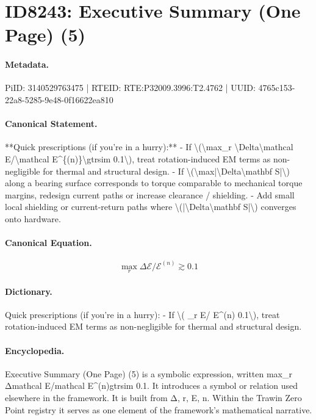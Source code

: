 \section*{ID8243: Executive Summary (One Page) (5)}
\paragraph{Metadata.}
PiID: 3140529763475 | RTEID: RTE:P32009.3996:T2.4762 | UUID: 4765c153-22a8-5285-9e48-0f16622ea810

\paragraph{Canonical Statement.}
**Quick prescriptions (if you’re in a hurry):** - If \textbackslash{}(\textbackslash{}max\_r \textbackslash{}Delta\textbackslash{}mathcal E/\textbackslash{}mathcal E\textasciicircum{}\{(n)\}\textbackslash{}gtrsim 0.1\textbackslash{}), treat rotation-induced EM terms as non-negligible for thermal and structural design. - If \textbackslash{}(\textbackslash{}max|\textbackslash{}Delta\textbackslash{}mathbf S|\textbackslash{}) along a bearing surface corresponds to torque comparable to mechanical torque margins, redesign current paths or increase clearance / shielding. - Add small local shielding or current-return paths where \textbackslash{}(|\textbackslash{}Delta\textbackslash{}mathbf S|\textbackslash{}) converges onto hardware.

\paragraph{Canonical Equation.}
\[
\max_r \Delta\mathcal E/\mathcal E^{(n)}\gtrsim 0.1
\]

\paragraph{Dictionary.}
Quick prescriptions (if you’re in a hurry): - If \textbackslash{}( \_r E/ E\textasciicircum{}(n) 0.1\textbackslash{}), treat rotation-induced EM terms as non-negligible for thermal and structural design.

\paragraph{Encyclopedia.}
Executive Summary (One Page) (5) is a symbolic expression, written max\_r Δmathcal E/mathcal E\textasciicircum{}(n)gtrsim 0.1. It introduces a symbol or relation used elsewhere in the framework. It is built from Δ, r, E, n. Within the Trawin Zero Point registry it serves as one element of the framework's mathematical narrative.
